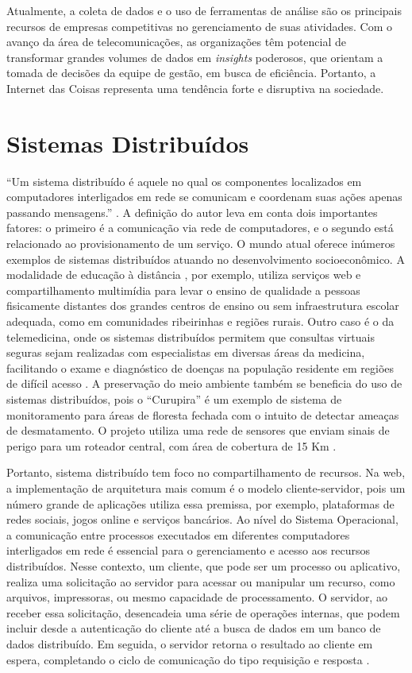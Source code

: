 Atualmente, a coleta de dados e o uso de ferramentas de análise são os principais recursos de empresas competitivas no gerenciamento de suas atividades. Com o 
avanço da área de telecomunicações, as organizações têm potencial de transformar grandes volumes de dados em \textit{insights} poderosos, que orientam a tomada de 
decisões da equipe de gestão, em busca de eficiência. Portanto, a Internet das Coisas representa uma tendência forte e disruptiva na sociedade.

\section{Sistemas Distribuídos}

``Um sistema distribuído é aquele no qual os componentes localizados em computadores interligados em rede se comunicam e coordenam suas ações apenas passando mensagens.'' \cite[pp. 1]{sistemas-distribuidos-coulouris2013}.
A definição do autor leva em conta dois importantes fatores: o primeiro é a comunicação via rede de computadores, e o segundo está relacionado ao provisionamento de um serviço.
O mundo atual oferece inúmeros exemplos de sistemas distribuídos atuando no desenvolvimento socioeconômico. A modalidade de educação à distância \cite{mec-ead}, por exemplo, utiliza serviços 
web e compartilhamento multimídia para levar o ensino de qualidade a pessoas fisicamente distantes dos grandes centros de ensino ou sem infraestrutura escolar adequada, como em comunidades 
ribeirinhas e regiões rurais. Outro caso é o da telemedicina, onde os sistemas distribuídos permitem que consultas virtuais seguras sejam realizadas com 
especialistas em diversas áreas da medicina, facilitando o exame e diagnóstico de doenças na população residente em regiões de difícil acesso \cite{telemedicina}. A preservação do meio ambiente 
também se beneficia do uso de sistemas distribuídos, pois o ``Curupira'' é um exemplo de sistema de monitoramento para áreas de floresta fechada com o intuito de detectar ameaças de desmatamento. O projeto utiliza 
uma rede de sensores que enviam sinais de perigo para um roteador central, com área de cobertura de 15 Km \cite{curupira}.

Portanto, sistema distribuído tem foco no compartilhamento de recursos. Na web, a implementação de arquitetura mais comum é o modelo cliente-servidor, pois
um número grande de aplicações utiliza essa premissa, por exemplo, plataformas de redes sociais, jogos online e serviços bancários.
Ao nível do Sistema Operacional, a comunicação entre processos executados em diferentes computadores interligados em rede é essencial para o gerenciamento e acesso aos recursos distribuídos.
Nesse contexto, um cliente, que pode ser um processo ou aplicativo, realiza uma solicitação ao servidor para acessar ou manipular um recurso, como arquivos, impressoras, ou mesmo capacidade de processamento. O servidor, 
ao receber essa solicitação, desencadeia uma série de operações internas, que podem incluir desde a autenticação do cliente até a busca de dados em um banco de dados distribuído. Em seguida, o servidor 
retorna o resultado ao cliente em espera, completando o ciclo de comunicação do tipo requisição e resposta \cite[pp. 16]{sistemas-distribuidos-coulouris2013}.

